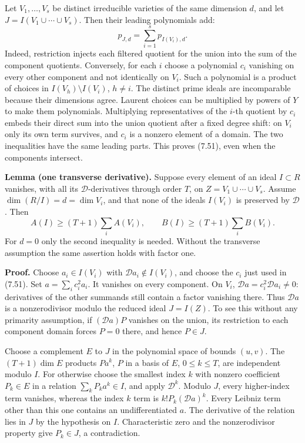 \documentclass[
  11pt,
  a4paper,
]{article}
\newcounter{none} %
\begin{document}
Let \(V_1,\ldots,V_s\) be distinct irreducible varieties of the same
dimension \(d\), and let \(J=I(V_1\cup\cdots\cup V_s)\). Then their
leading polynomials add: \[
p_{J,d}=\sum_{i=1}^s p_{I(V_i),d}. \tag{7.51}
\] Indeed, restriction injects each filtered quotient for the union into
the sum of the component quotients. Conversely, for each \(i\) choose a
polynomial \(c_i\) vanishing on every other component and not
identically on \(V_i\). Such a polynomial is a product of choices in
\(I(V_h)\setminus I(V_i)\), \(h\ne i\). The distinct prime ideals are
incomparable because their dimensions agree. Laurent choices can be
multiplied by powers of \(Y\) to make them polynomials. Multiplying
representatives of the \(i\)-th quotient by \(c_i\) embeds their direct
sum into the union quotient after a fixed degree shift: on \(V_i\) only
its own term survives, and \(c_i\) is a nonzero element of a domain. The
two inequalities have the same leading parts. This proves (7.51), even
when the components intersect.

\textbf{Lemma (one transverse derivative).} Suppose every element of an
ideal \(I\subset R\) vanishes, with all its \(\mathcal D\)-derivatives
through order \(T\), on \(Z=V_1\cup\cdots\cup V_s\). Assume
\(\dim(R/I)=d=\dim V_i\), and that none of the ideals \(I(V_i)\) is
preserved by \(\mathcal D\). Then \[
A(I)\ge(T+1)\sum_i A(V_i),\qquad
B(I)\ge(T+1)\sum_i B(V_i).
\tag{7.52}
\] For \(d=0\) only the second inequality is needed. Without the
transverse assumption the same assertion holds with factor one.

\textbf{Proof.} Choose \(a_i\in I(V_i)\) with
\(\mathcal D a_i\notin I(V_i)\), and choose the \(c_i\) just used in
(7.51). Set \(a=\sum_i c_i^2a_i\). It vanishes on every component. On
\(V_i\), \(\mathcal D a=c_i^2\mathcal D a_i\ne0\): derivatives of the
other summands still contain a factor vanishing there. Thus
\(\mathcal D a\) is a nonzerodivisor modulo the reduced ideal
\(J=I(Z)\). To see this without any primarity assumption, if
\((\mathcal D a)P\) vanishes on the union, its restriction to each
component domain forces \(P=0\) there, and hence \(P\in J\).

Choose a complement \(E\) to \(J\) in the polynomial space of bounds
\((u,v)\). The \((T+1)\dim E\) products \(P a^k\), \(P\) in a basis of
\(E\), \(0\le k\le T\), are independent modulo \(I\). For otherwise
choose the smallest index \(k\) with nonzero coefficient \(P_k\in E\) in
a relation \(\sum_k P_k a^k\in I\), and apply \(\mathcal D^k\). Modulo
\(J\), every higher-index term vanishes, whereas the index \(k\) term is
\(k!P_k(\mathcal D a)^k\). Every Leibniz term other than this one
contains an undifferentiated \(a\). The derivative of the relation lies
in \(J\) by the hypothesis on \(I\). Characteristic zero and the
nonzerodivisor property give \(P_k\in J\), a contradiction.
\end{document}
